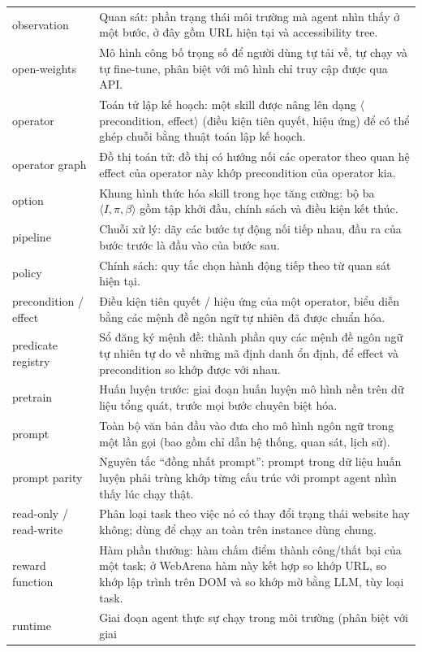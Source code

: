 \begin{longtable}{L{4.2cm} L{9.8cm}}
observation & Quan sát: phần trạng thái môi trường mà agent nhìn thấy ở một
bước, ở đây gồm URL hiện tại và accessibility tree. \\
open-weights & Mô hình công bố trọng số để người dùng tự tải về, tự chạy và
tự fine-tune, phân biệt với mô hình chỉ truy cập được qua API. \\
operator & Toán tử lập kế hoạch: một skill được nâng lên dạng
$\langle$precondition, effect$\rangle$ (điều kiện tiên quyết, hiệu ứng) để
có thể ghép chuỗi bằng thuật toán lập kế hoạch. \\
operator graph & Đồ thị toán tử: đồ thị có hướng nối các operator theo quan
hệ effect của operator này khớp precondition của operator kia. \\
option & Khung hình thức hóa skill trong học tăng cường: bộ ba $\langle I,
\pi, \beta \rangle$ gồm tập khởi đầu, chính sách và điều kiện kết thúc. \\
pipeline & Chuỗi xử lý: dãy các bước tự động nối tiếp nhau, đầu ra của bước
trước là đầu vào của bước sau. \\
policy & Chính sách: quy tắc chọn hành động tiếp theo từ quan sát hiện tại. \\
precondition / effect & Điều kiện tiên quyết / hiệu ứng của một operator,
biểu diễn bằng các mệnh đề ngôn ngữ tự nhiên đã được chuẩn hóa. \\
predicate registry & Sổ đăng ký mệnh đề: thành phần quy các mệnh đề ngôn ngữ tự nhiên tự do về những mã định danh ổn định, để effect và precondition so khớp được với nhau. \\
pretrain & Huấn luyện trước: giai đoạn huấn luyện mô hình nền trên dữ liệu
tổng quát, trước mọi bước chuyên biệt hóa. \\
prompt & Toàn bộ văn bản đầu vào đưa cho mô hình ngôn ngữ trong một lần
gọi (bao gồm chỉ dẫn hệ thống, quan sát, lịch sử). \\
prompt parity & Nguyên tắc ``đồng nhất prompt'': prompt trong dữ liệu huấn
luyện phải trùng khớp từng cấu trúc với prompt agent nhìn thấy lúc chạy
thật. \\
read-only / read-write & Phân loại task theo việc nó có thay đổi trạng thái
website hay không; dùng để chạy an toàn trên instance dùng chung. \\
reward function & Hàm phần thưởng: hàm chấm điểm thành công/thất bại của
một task; ở WebArena hàm này kết hợp so khớp URL, so khớp lập trình trên
DOM và so khớp mờ bằng LLM, tùy loại task. \\
runtime & Giai đoạn agent thực sự chạy trong môi trường (phân biệt với giai

\end{longtable}
